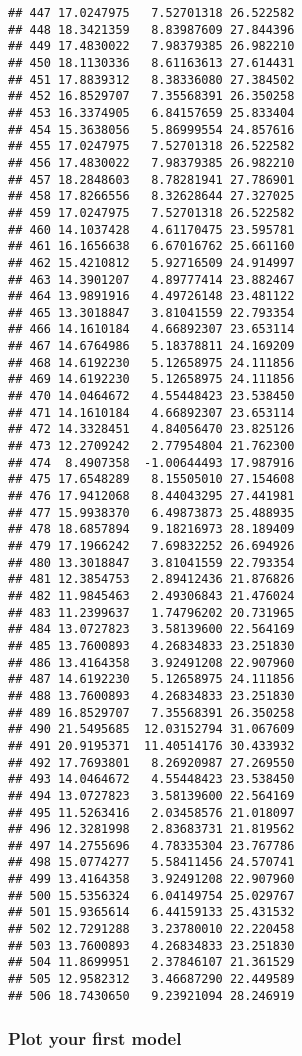 \documentclass[]{article}
\begin{document}
\begin{verbatim}
## 447 17.0247975   7.52701318 26.522582
## 448 18.3421359   8.83987609 27.844396
## 449 17.4830022   7.98379385 26.982210
## 450 18.1130336   8.61163613 27.614431
## 451 17.8839312   8.38336080 27.384502
## 452 16.8529707   7.35568391 26.350258
## 453 16.3374905   6.84157659 25.833404
## 454 15.3638056   5.86999554 24.857616
## 455 17.0247975   7.52701318 26.522582
## 456 17.4830022   7.98379385 26.982210
## 457 18.2848603   8.78281941 27.786901
## 458 17.8266556   8.32628644 27.327025
## 459 17.0247975   7.52701318 26.522582
## 460 14.1037428   4.61170475 23.595781
## 461 16.1656638   6.67016762 25.661160
## 462 15.4210812   5.92716509 24.914997
## 463 14.3901207   4.89777414 23.882467
## 464 13.9891916   4.49726148 23.481122
## 465 13.3018847   3.81041559 22.793354
## 466 14.1610184   4.66892307 23.653114
## 467 14.6764986   5.18378811 24.169209
## 468 14.6192230   5.12658975 24.111856
## 469 14.6192230   5.12658975 24.111856
## 470 14.0464672   4.55448423 23.538450
## 471 14.1610184   4.66892307 23.653114
## 472 14.3328451   4.84056470 23.825126
## 473 12.2709242   2.77954804 21.762300
## 474  8.4907358  -1.00644493 17.987916
## 475 17.6548289   8.15505010 27.154608
## 476 17.9412068   8.44043295 27.441981
## 477 15.9938370   6.49873873 25.488935
## 478 18.6857894   9.18216973 28.189409
## 479 17.1966242   7.69832252 26.694926
## 480 13.3018847   3.81041559 22.793354
## 481 12.3854753   2.89412436 21.876826
## 482 11.9845463   2.49306843 21.476024
## 483 11.2399637   1.74796202 20.731965
## 484 13.0727823   3.58139600 22.564169
## 485 13.7600893   4.26834833 23.251830
## 486 13.4164358   3.92491208 22.907960
## 487 14.6192230   5.12658975 24.111856
## 488 13.7600893   4.26834833 23.251830
## 489 16.8529707   7.35568391 26.350258
## 490 21.5495685  12.03152794 31.067609
## 491 20.9195371  11.40514176 30.433932
## 492 17.7693801   8.26920987 27.269550
## 493 14.0464672   4.55448423 23.538450
## 494 13.0727823   3.58139600 22.564169
## 495 11.5263416   2.03458576 21.018097
## 496 12.3281998   2.83683731 21.819562
## 497 14.2755696   4.78335304 23.767786
## 498 15.0774277   5.58411456 24.570741
## 499 13.4164358   3.92491208 22.907960
## 500 15.5356324   6.04149754 25.029767
## 501 15.9365614   6.44159133 25.431532
## 502 12.7291288   3.23780010 22.220458
## 503 13.7600893   4.26834833 23.251830
## 504 11.8699951   2.37846107 21.361529
## 505 12.9582312   3.46687290 22.449589
## 506 18.7430650   9.23921094 28.246919
\end{verbatim}

\hypertarget{plot-your-first-model}{%
\subsubsection{Plot your first model}\label{plot-your-first-model}}
\end{document}
